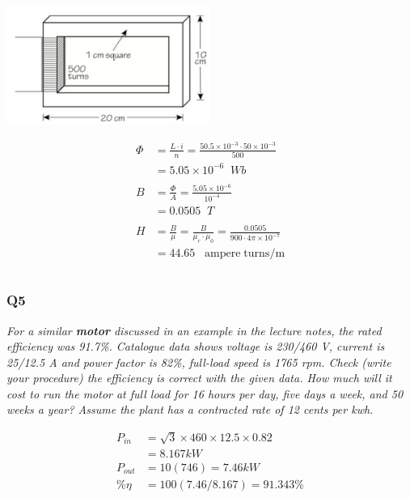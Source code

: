 \documentclass[a4paper,11pt]{article}
\begin{document}
\includegraphics[width=0.5\textwidth]{core.png}

\begin{align*}
    \Phi & = \frac{L\cdot i}{n} = \frac{50.5\times10^{-3} \cdot 50 \times 10^{-3}}{500}                           \\&= 5.05\times10^{-6}\;\;Wb\\\\
    B    & = \frac{\Phi}{A} = \frac{5.05\times10^{-6}}{10^{-4}}                                                   \\
         & = 0.0505 \;\;T                                                                              \\\\
    H    & = \frac{B}{\mu} = \frac{B}{\mu_r \cdot \mu_0} = \frac{0.0505}{900 \cdot 4\pi\times 10^{-7}} \\
         & = 44.65 \;\;\;\mathrm{ampere \; turns/m}                                                               \\\\
\end{align*}



\subsubsection*{Q5}
\textit{For a similar \textbf{motor} discussed in an example in the lecture notes, the rated efficiency was 91.7\%. Catalogue data shows voltage is 230/460 V, current is 25/12.5 A and power factor is 82\%, full-load speed is 1765 rpm. Check (write your procedure) the efficiency is correct with the given data. How much will it cost to run the motor at full load for 16 hours per day, five days a week, and 50 weeks a year? Assume the plant has a contracted rate of 12 cents per kwh.}

\begin{align*}
    P_{in} & =\sqrt{3}\times460\times12.5\times0.82 \\
           & = 8.167kW \\
    P_{out} &= 10(746) = 7.46kW \\
    \%\eta &= 100(7.46/8.167)=91.343\%
\end{align*}
\end{document}
